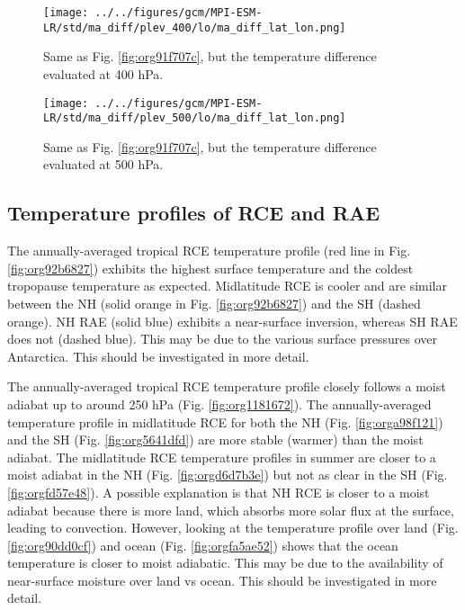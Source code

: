 \documentclass[11pt]{article}
\begin{document}
\begin{figure}[htbp]
\centering
\texttt{[image: ../../figures/gcm/MPI-ESM-LR/std/ma\_diff/plev\_400/lo/ma\_diff\_lat\_lon.png]}
\caption{\label{fig:org3778dc0}Same as Fig. \ref{fig:org91f707c}, but the temperature difference evaluated at 400 hPa.}
\end{figure}

\begin{figure}[htbp]
\centering
\texttt{[image: ../../figures/gcm/MPI-ESM-LR/std/ma\_diff/plev\_500/lo/ma\_diff\_lat\_lon.png]}
\caption{\label{fig:orgea41e15}Same as Fig. \ref{fig:org91f707c}, but the temperature difference evaluated at 500 hPa.}
\end{figure}

\subsection{Temperature profiles of RCE and RAE}
\label{sec:orgbae45fb}
The annually-averaged tropical RCE temperature profile (red line in Fig. \ref{fig:org92b6827}) exhibits the highest surface temperature and the coldest tropopause temperature as expected. Midlatitude RCE is cooler and are similar between the NH (solid orange in Fig. \ref{fig:org92b6827}) and the SH (dashed orange). NH RAE (solid blue) exhibits a near-surface inversion, whereas SH RAE does not (dashed blue). This may be due to the various surface pressures over Antarctica. This should be investigated in more detail.

The annually-averaged tropical RCE temperature profile closely follows a moist adiabat up to around 250 hPa (Fig. \ref{fig:org1181672}). The annually-averaged temperature profile in midlatitude RCE for both the NH (Fig. \ref{fig:orga98f121}) and the SH (Fig. \ref{fig:org5641dfd}) are more stable (warmer) than the moist adiabat. The midlatitude RCE temperature profiles in summer are closer to a moist adiabat in the NH (Fig. \ref{fig:orgd6d7b3e}) but not as clear in the SH (Fig. \ref{fig:orgfd57e48}). A possible explanation is that NH RCE is closer to a moist adiabat because there is more land, which absorbs more solar flux at the surface, leading to convection. However, looking at the temperature profile over land (Fig. \ref{fig:org90dd0cf}) and ocean (Fig. \ref{fig:orgfa5ae52}) shows that the ocean temperature is closer to moist adiabatic. This may be due to the availability of near-surface moisture over land vs ocean. This should be investigated in more detail.
\end{document}
